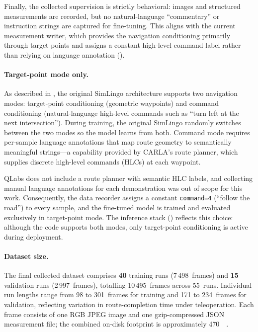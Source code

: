 Finally, the collected supervision is strictly behavioral: images and structured measurements are recorded, but no natural-language ``commentary'' or instruction strings are captured for fine-tuning. This aligns with the current measurement writer, which provides the navigation conditioning primarily through target points and assigns a constant high-level command label rather than relying on language annotation ().

\paragraph{Target-point mode only.}
As described in , the original SimLingo architecture supports two navigation modes: target-point conditioning (geometric waypoints) and command conditioning (natural-language high-level commands such as ``turn left at the next intersection''). During training, the original SimLingo randomly switches between the two modes so the model learns from both. Command mode requires per-sample language annotations that map route geometry to semantically meaningful strings---a capability provided by CARLA's route planner, which supplies discrete high-level commands (HLCs) at each waypoint.

QLabs does not include a route planner with semantic HLC labels, and collecting manual language annotations for each demonstration was out of scope for this work. Consequently, the data recorder assigns a constant \texttt{command=4} (``follow the road'') to every sample, and the fine-tuned model is trained and evaluated exclusively in target-point mode. The inference stack () reflects this choice: although the code supports both modes, only target-point conditioning is active during deployment.

\paragraph{Dataset size.}
The final collected dataset comprises \textbf{40} training runs (7\,498~frames) and \textbf{15} validation runs (2\,997~frames), totalling 10\,495~frames across 55~runs. Individual run lengths range from 98 to 301~frames for training and 171 to 234~frames for validation, reflecting variation in route-completion time under teleoperation. Each frame consists of one RGB JPEG image and one gzip-compressed JSON measurement file; the combined on-disk footprint is approximately \SI{470}{\mebi\byte}.


